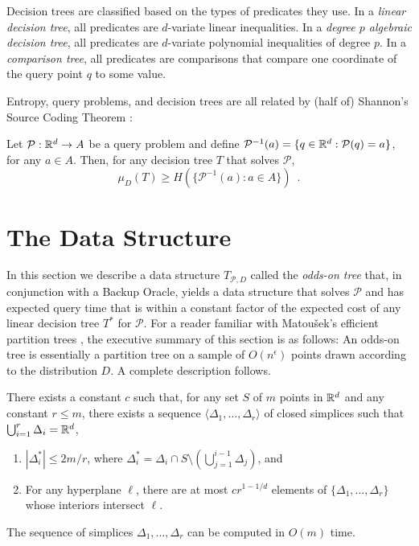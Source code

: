 \documentclass{patmorin}
\begin{document}
Decision trees are classified based on the types of predicates they
use.  In a \emph{linear decision tree}, all predicates are $d$-variate
linear inequalities.  In a \emph{degree $p$ algebraic decision tree},
all predicates are $d$-variate polynomial inequalities of degree $p$.
In a \emph{comparison tree}, all predicates are comparisons that compare
one coordinate of the query point $q$ to some value.

Entropy, query problems, and decision trees are all related by (half of)
Shannon's Source Coding Theorem \cite{s48}:

\begin{thm}
  Let $\mathcal{P}:\mathbb{R}^d\rightarrow A$ be a query problem and define
  $\mathcal{P}^{-1}(a)=\{q\in\mathbb{R}^d:\mathcal{P}(q)=a\}$, for any $a\in
  A$. Then, for any decision tree $T$ that solves $\mathcal{P}$,
  \[
    \mu_D(T) \ge H(\{\mathcal{P}^{-1}(a): a\in A\}) \enspace .
  \]
\end{thm}


\section{The Data Structure}

In this section we describe a data structure $T_{\mathcal{P},D}$ called
the \emph{odds-on tree} that, in conjunction with a Backup Oracle, yields
a data structure that solves $\mathcal{P}$ and has expected query time
that is within a constant factor of the expected cost of any
linear decision tree $T^*$ for $\mathcal{P}$.   For a reader familiar
with Matou\v{s}ek's efficient partition trees \cite{m92},  the executive
summary of this section is as follows: An odds-on tree is essentially a
partition tree on a sample of $O(n^\epsilon)$ points drawn according to
the distribution $D$.  A complete description follows.

\begin{thm}[Matou\v{s}ek 1992]
There exists a constant $c$ such that, for any set $S$ of $m$
points in $\mathbb{R}^d$ and any constant $r\le m$, there exists a sequence
$\langle \Delta_1,\ldots,\Delta_r\rangle$ of closed simplices such that
$\bigcup_{i=1}^r \Delta_i = \mathbb{R}^d$,
  \begin{enumerate}
    \item $|\Delta_i^*| \le 2m/r$, where $\Delta_i^*=\Delta_i \cap S\setminus
    \left(\bigcup_{j=1}^{i-1}\Delta_j\right)$, and
    \item For any hyperplane $\ell$, there are at most $cr^{1-1/d}$ elements of
  $\{\Delta_1,\ldots,\Delta_r\}$ whose interiors intersect $\ell$.
  \end{enumerate}
  The sequence of simplices $\Delta_1,\ldots,\Delta_r$ can be computed
  in $O(m)$ time.
\end{thm}
\end{document}
